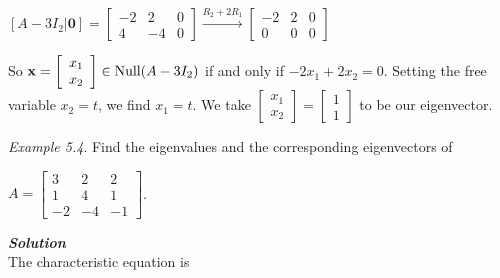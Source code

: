 \documentclass[
  letterpaper,
  DIV=11,
  numbers=noendperiod]{scrartcl}
\theoremstyle{remark}
\begin{document}
\(\left[A - 3I_{2} | \mathbf{0}\right] = \left[\begin{array}{cc|c} -2 & 2 & 0 \\ 4 & -4 & 0 \end{array}\right] \xrightarrow{R_{2} + 2R_{1}} \left[\begin{array}{cc|c} -2 & 2 & 0 \\ 0 & 0 & 0 \end{array}\right]\)

So
\(\mathbf{x} = \left[\begin{array}{c} x_{1} \\ x_{2} \end{array}\right] \in {\rm Null}(A - 3I_{2})\)
if and only if \(-2x_{1} + 2x_{2} = 0\). Setting the free variable
\(x_{2} = t\), we find \(x_{1} = t\). We take
\(\left[\begin{array}{c} x_{1} \\ x_{2} \end{array}\right] = \left[\begin{array}{c} 1 \\ 1 \end{array}\right]\)
to be our eigenvector.

\emph{Example 5.4}. Find the eigenvalues and the corresponding
eigenvectors of

\(A = \left[\begin{array}{ccc}
            3 & 2 & 2 \\
            1 & 4 & 1 \\
            -2 & -4 & -1
        \end{array}\right]\).

\textbf{\emph{Solution}}\\
The characteristic equation is
\end{document}
